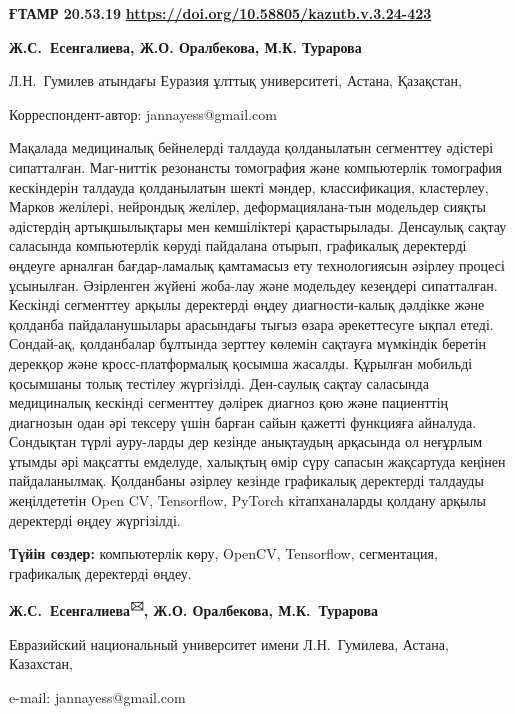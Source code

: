 \newpage
{\bfseries ҒТАМР 20.53.19}
\hfill {\bfseries \href{https://doi.org/10.58805/kazutb.v.3.24-423}{https://doi.org/10.58805/kazutb.v.3.24-423}}


\begin{center}
 
{\bfseries Ж.С.~Есенгалиева\envelope, Ж.О. Оралбекова, М.К.
Турарова}

Л.Н.~Гумилев атындағы Еуразия ұлттық университеті, Астана, Қазақстан,
\end{center}
\envelope Корреспондент-автор: jannayess@gmail.com \vspace{0.5cm}

Мақалада медициналық бейнелерді талдауда қолданылатын сегменттеу
әдістері сипатталған. Маг-ниттік резонансты томография және компьютерлік
томография кескіндерін талдауда қолданылатын шекті мәндер,
классификация, кластерлеу, Марков желілері, нейрондық желілер,
деформациялана-тын модельдер сияқты әдістердің артықшылықтары мен
кемшіліктері қарастырылады. Денсаулық сақтау саласында компьютерлік
көруді пайдалана отырып, графикалық деректерді өңдеуге арналған
бағдар-ламалық қамтамасыз ету технологиясын әзірлеу процесі ұсынылған.
Әзірленген жүйені жоба-лау және модельдеу кезеңдері сипатталған. Кескінді
сегменттеу арқылы деректерді өңдеу диагности-калық дәлдікке және қолданба
пайдаланушылары арасындағы тығыз өзара әрекеттесуге ықпал етеді.
Сондай-ақ, қолданбалар бұлтында зерттеу көлемін сақтауға мүмкіндік
беретін дерекқор және кросс-платформалық қосымша жасалды. Құрылған
мобильді қосымшаны толық тестілеу жүргізілді. Ден-саулық сақтау саласында
медициналық кескінді сегменттеу дәлірек диагноз қою және пациенттің
диагнозын одан әрі тексеру үшін барған сайын қажетті функцияға айналуда.
Сондықтан түрлі ауру-ларды дер кезінде анықтаудың арқасында ол неғұрлым
ұтымды әрі мақсатты емделуде, халықтың өмір сүру сапасын жақсартуда
кеңінен пайдаланылмақ. Қолданбаны әзірлеу кезінде графикалық деректерді
талдауды жеңілдететін Open CV, Tensorflow, PyTorch кітапханаларды
қолдану арқылы деректерді өңдеу жүргізілді.

{\bfseries Түйін сөздер:} компьютерлік көру, OpenCV, Tensorflow,
сегментация, графикалық деректерді өңдеу.


\begin{center}


{\bfseries Ж.С.~Есенгалиева\textsuperscript{🖂}, Ж.О. Оралбекова,
М.К.~Турарова}

Евразийский национальный университет имени Л.Н.~Гумилева, Астана,
Казахстан,

e-mail: jannayess@gmail.com
\end{center}


